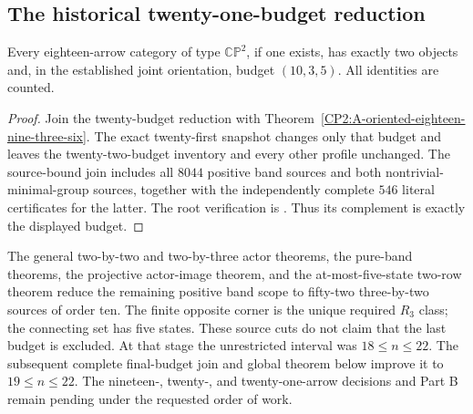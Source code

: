\subsection{The historical twenty-one-budget reduction}

\begin{corollary}
\label{CP2:A-eighteen-one-two-object-budget}
Every eighteen-arrow category of type $\mathbb{CP}^2$, if one exists,
has exactly two objects and, in the established joint orientation,
budget $(10,3,5)$. All identities are counted.
\end{corollary}
\begin{proof}
Join the twenty-budget reduction with
Theorem~\ref{CP2:A-oriented-eighteen-nine-three-six}.
The exact twenty-first snapshot changes only that budget and leaves
the twenty-two-budget inventory and every other profile unchanged.
The source-bound join includes all $8044$ positive band sources and
both nontrivial-minimal-group sources, together with the independently
complete $546$ literal certificates for the latter.
The root verification is
.
Thus its complement is exactly the displayed budget.
\end{proof}

\begin{remark*}
The general two-by-two and two-by-three actor theorems, the pure-band
theorems, the projective actor-image theorem, and the at-most-five-state
two-row theorem reduce the remaining positive band scope to fifty-two
three-by-two sources of order ten. The finite opposite corner is the
unique required $R_3$ class; the connecting set has five states.
These source cuts do not claim that the last budget is excluded.
At that stage the unrestricted interval was $18\le n\le22$. The subsequent complete final-budget join and global theorem below improve it to $19\le n\le22$.
The nineteen-, twenty-, and twenty-one-arrow decisions and Part B
remain pending under the requested order of work.
\end{remark*}
